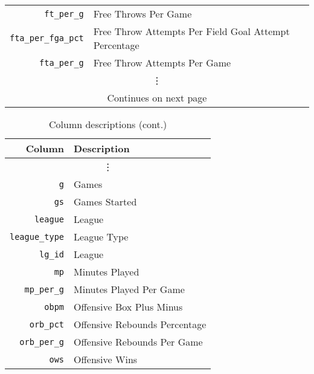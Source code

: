 \begin{table}[H]
\begin{tabular}{rl}
    \texttt{ft\_per\_g}          & Free Throws Per Game                                          \\
    \texttt{fta\_per\_fga\_pct}  & Free Throw Attempts Per Field Goal Attempt Percentage         \\
    \texttt{fta\_per\_g}         & Free Throw Attempts Per Game                                  \\
    \multicolumn{2}{c}{\vdots} \\
  \midrule
    \multicolumn{2}{c}{Continues on next page} \\
  \bottomrule
\end{tabular}
\end{table}

\begin{table}[H]
  \centering
  \caption{Column descriptions (cont.)}
  \begin{tabular}{rl}
    \toprule
    \textbf{Column} & \textbf{Description} \\
    \midrule
    \multicolumn{2}{c}{\vdots} \\
    \texttt{g}                   & Games                                                         \\
    \texttt{gs}                  & Games Started                                                 \\
    \texttt{league}              & League                                                        \\
    \texttt{league\_type}        & League Type                                                   \\
    \texttt{lg\_id}              & League                                                        \\
    \texttt{mp}                  & Minutes Played                                                \\
    \texttt{mp\_per\_g}          & Minutes Played Per Game                                       \\
    \texttt{obpm}                & Offensive Box Plus Minus                                      \\
    \texttt{orb\_pct}            & Offensive Rebounds Percentage                                 \\
    \texttt{orb\_per\_g}         & Offensive Rebounds Per Game                                   \\
    \texttt{ows}                 & Offensive Wins                                                \\

\end{tabular}
\end{table}
